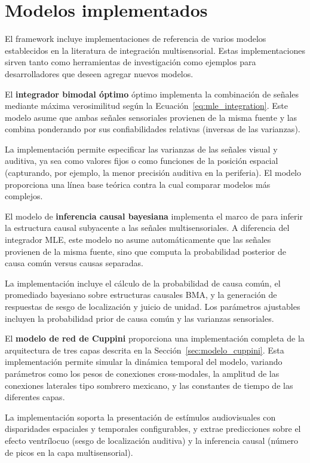 \section{Modelos implementados}
\label{sec:snmsi_modelos}

El framework incluye implementaciones de referencia de varios modelos establecidos en la literatura de integración multisensorial. Estas implementaciones sirven tanto como herramientas de investigación como ejemplos para desarrolladores que deseen agregar nuevos modelos.

\medskip
El \textbf{integrador bimodal óptimo} óptimo implementa la combinación de señales mediante máxima verosimilitud según la Ecuación~\ref{eq:mle_integration}. Este modelo asume que ambas señales sensoriales provienen de la misma fuente y las combina ponderando por sus confiabilidades relativas (inversas de las varianzas).

La implementación permite especificar las varianzas de las señales visual y auditiva, ya sea como valores fijos o como funciones de la posición espacial (capturando, por ejemplo, la menor precisión auditiva en la periferia). El modelo proporciona una línea base teórica contra la cual comparar modelos más complejos.

\medskip
El modelo de \textbf{inferencia causal bayesiana} implementa el marco de \citet{kording2007causal} para inferir la estructura causal subyacente a las señales multisensoriales. A diferencia del integrador MLE, este modelo no asume automáticamente que las señales provienen de la misma fuente, sino que computa la probabilidad posterior de causa común versus causas separadas.

La implementación incluye el cálculo de la probabilidad de causa común, el promediado bayesiano sobre estructuras causales \acrfull{BMA}, y la generación de respuestas de sesgo de localización y juicio de unidad. Los parámetros ajustables incluyen la probabilidad prior de causa común y las varianzas sensoriales.

\medskip
El \textbf{modelo de red de Cuppini} proporciona una implementación completa de la arquitectura de tres capas descrita en la Sección~\ref{sec:modelo_cuppini}. Esta implementación permite simular la dinámica temporal del modelo, variando parámetros como los pesos de conexiones cross-modales, la amplitud de las conexiones laterales tipo sombrero mexicano, y las constantes de tiempo de las diferentes capas.

La implementación soporta la presentación de estímulos audiovisuales con disparidades espaciales y temporales configurables, y extrae predicciones sobre el efecto ventrílocuo (sesgo de localización auditiva) y la inferencia causal (número de picos en la capa multisensorial).

